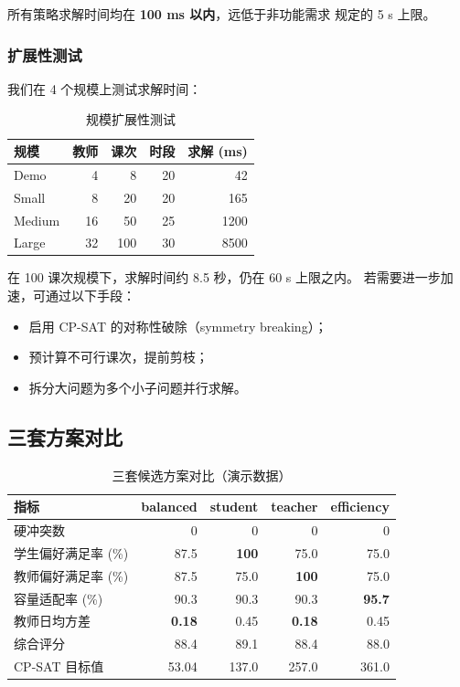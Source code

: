所有策略求解时间均在 \textbf{100 ms 以内}，远低于非功能需求
规定的 5 s 上限。

\subsubsection{扩展性测试}

我们在 4 个规模上测试求解时间：

\begin{table}[h]
\centering
\caption{规模扩展性测试}
\label{tab:scale-test}
\small
\begin{tabularx}{\textwidth}{l r r r r}
\toprule
\textbf{规模} & \textbf{教师} & \textbf{课次} & \textbf{时段} &
  \textbf{求解 (ms)} \\
\midrule
Demo
  & 4 & 8 & 20 & 42 \\
Small
  & 8 & 20 & 20 & 165 \\
Medium
  & 16 & 50 & 25 & 1200 \\
Large
  & 32 & 100 & 30 & 8500 \\
\bottomrule
\end{tabularx}
\end{table}

在 100 课次规模下，求解时间约 8.5 秒，仍在 60 s 上限之内。
若需要进一步加速，可通过以下手段：
\begin{itemize}[leftmargin=2em,itemsep=0.1em]
\item 启用 CP-SAT 的对称性破除（symmetry breaking）；
\item 预计算不可行课次，提前剪枝；
\item 拆分大问题为多个小子问题并行求解。
\end{itemize}

\subsection{三套方案对比}

\begin{table}[h]
\centering
\caption{三套候选方案对比（演示数据）}
\label{tab:three-plans}
\small
\begin{tabularx}{\textwidth}{l r r r r}
\toprule
\textbf{指标} & \textbf{balanced} & \textbf{student} &
  \textbf{teacher} & \textbf{efficiency} \\
\midrule
硬冲突数 & 0 & 0 & 0 & 0 \\
学生偏好满足率 (\%) & 87.5 & \textbf{100} & 75.0 & 75.0 \\
教师偏好满足率 (\%) & 87.5 & 75.0 & \textbf{100} & 75.0 \\
容量适配率 (\%) & 90.3 & 90.3 & 90.3 & \textbf{95.7} \\
教师日均方差 & \textbf{0.18} & 0.45 & \textbf{0.18} & 0.45 \\
综合评分 & 88.4 & 89.1 & 88.4 & 88.0 \\
CP-SAT 目标值 & 53.04 & 137.0 & 257.0 & 361.0 \\
\bottomrule
\end{tabularx}
\end{table}

